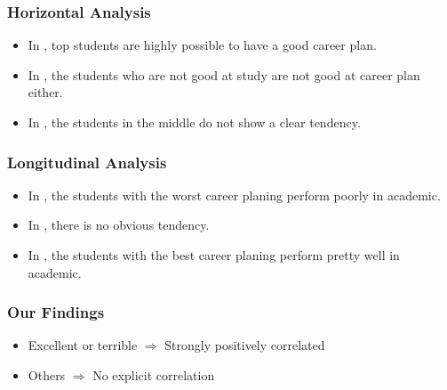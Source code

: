 \begin{frame}
    \frametitle{Horizontal Analysis}
    \Large
    \begin{itemize}[<+->]
        \item In , top students are highly possible to have a good career plan.
        \item In , the students who are not good at study are not good at career plan either.
        \item In , the students in the middle do not show a clear tendency.
    \end{itemize}
\end{frame}

\begin{frame}
    \frametitle{Longitudinal Analysis}
    \Large
    \begin{itemize}[<+->]
        \item In , the students with the worst career planing perform poorly in academic.
        \item In , there is no obvious tendency.
        \item In , the students with the best career planing perform pretty well in academic.
    \end{itemize}
\end{frame}

\begin{frame}
    \frametitle{Our Findings}
    \LARGE
    \begin{itemize}
        \item Excellent or terrible $\Rightarrow$ Strongly positively correlated \label{itm:Findings}
        \item Others $\Rightarrow$ No explicit correlation
    \end{itemize}
\end{frame}